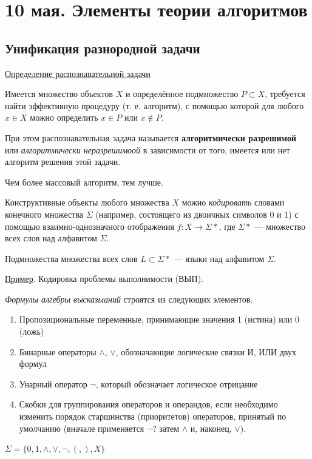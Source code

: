 \chapter{10 мая. Элементы теории алгоритмов}
\section{Унификация разнородной задачи}
\underline{Определение распознавательной задачи}

Имеется множество объектов $X$ и определённое подмножество $P \subset X$, требуется найти эффективную процедуру (т. е. алгоритм), с помощью которой для любого $x \in X$ можно определить $x \in P$ или $x \not\in P$.

\dftion При этом распознавательная задача называется \textbf{алгоритмически разрешимой} или \textit{алгоритмически неразрешимоой} в зависимости от того, имеется или нет алгоритм решения этой задачи.

Чем более массовый алгоритм, тем лучше.

Конструктивные объекты любого множества $X$ можно \textit{кодировать} словами конечного множества $\Sigma$ (например, состоящего из двоичных символов 0 и 1) с помощью взаимно-однозначного отображения $f: X \to \Sigma*$, где $\Sigma*$ --- множество всех слов над алфавитом $\Sigma$.

Подмножества множества всех слов $L \subset \Sigma*$ --- языки над алфавитом $\Sigma$.

\underline{Пример}. Кодировка проблемы выполнимости (ВЫП).

\textit{Формулы алгебры высказыаний} строятся из следующих элементов.

\begin{enumerate}
    \item Пропозициональные переменные, принимающие значения 1 (истина) или 0 (ложь)
    \item Бинарные операторы $\land$, $\lor$, обозначающие логические связки И, ИЛИ двух формул
    \item Унарный оператор $\lnot$, который обозначает логическое отрицание
    \item Скобки для группирования операторов и операндов, если необходимо изменить порядок старшинства (приоритетов) операторов, принятый по умолчанию (вначале применяется $\lnot$? затем $\land$ и, наконец, $\lor$).
\end{enumerate}

$\Sigma = \{0, 1, \land, \lor, \lnot, (, ), X\}$

